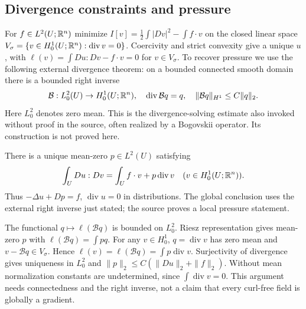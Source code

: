 \subsection{Divergence constraints and pressure}
For $f\in L^2(U;\mathbb{R}^n)$ minimize
$I[v]=\frac12\int|Dv|^2-\int f\cdot v$ on the closed linear space
$V_\sigma=\{v\in H^1_0(U;\mathbb{R}^n):\operatorname{div}v=0\}$.
Coercivity and strict convexity give a unique $u$, with
$\ell(v)=\int Du:Dv-f\cdot v=0$ for $v\in V_\sigma$.
To recover pressure we use the following external divergence theorem:
on a bounded connected smooth domain there is a bounded right inverse
\[
 \mathcal B:L^2_0(U)\to H^1_0(U;\mathbb{R}^n),\quad
 \operatorname{div}\mathcal Bq=q,\quad\|\mathcal Bq\|_{H^1}\leq C\|q\|_2.
\]
Here $L^2_0$ denotes zero mean. This is the divergence-solving estimate
also invoked without proof in the source, often realized by a Bogovskii
operator. Its construction is not proved here.
\Needspace{55mm}
\begin{theorem}
There is a unique mean-zero $p\in L^2(U)$ satisfying
\[
 \int_U Du:Dv=\int_U f\cdot v+p\operatorname{div}v
 \quad(v\in H^1_0(U;\mathbb{R}^n)).
\]
Thus $-\Delta u+Dp=f$, $\operatorname{div}u=0$ in distributions.
The global conclusion uses the external right inverse just stated; the
source proves a local pressure statement.
\end{theorem}
\begin{expandedproof}
The functional $q\mapsto\ell(\mathcal Bq)$ is bounded on $L^2_0$.
Riesz representation gives mean-zero $p$ with
$\ell(\mathcal Bq)=\int pq$. For any $v\in H^1_0$,
$q=\operatorname{div}v$ has zero mean and
$v-\mathcal Bq\in V_\sigma$. Hence
$\ell(v)=\ell(\mathcal Bq)=\int p\operatorname{div}v$.
Surjectivity of divergence gives uniqueness in $L^2_0$ and
$\|p\|_2\leq C(\|Du\|_2+\|f\|_2)$.
Without mean normalization constants are undetermined, since
$\int\operatorname{div}v=0$. This argument needs connectedness and the
right inverse, not a claim that every curl-free field is globally a gradient.
\end{expandedproof}
\Needspace{55mm}

\Needspace{45mm}
